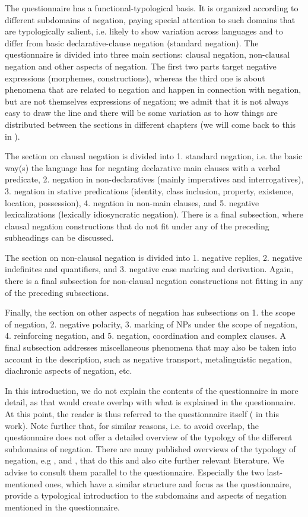 \documentclass[output=paper,colorlinks,citecolor=brown]{langscibook}
\begin{document}
The questionnaire has a functional-typological basis. It is organized according to different subdomains of negation, paying special attention to such domains that are typologically salient, i.e. likely to show variation across languages and to differ from basic declarative-clause negation (standard negation). The questionnaire is divided into three main sections: clausal negation, non-clausal negation and other aspects of negation. The first two parts target negative expressions (morphemes, constructions), whereas the third one is about phenomena that are related to negation and happen in connection with negation, but are not themselves expressions of negation; we admit that it is not always easy to draw the line and there will be some variation as to how things are distributed between the sections in different chapters (we will come back to this in ). 

The section on clausal negation is divided into 1. standard negation, i.e. the basic way(s) the language has for negating declarative main clauses with a verbal predicate, 2. negation in non-declaratives (mainly imperatives and interrogatives), 3. negation in stative predications (identity, class inclusion, property, existence, location, possession), 4. negation in non-main clauses, and 5. negative lexicalizations (lexically idiosyncratic negation). There is a final subsection, where clausal negation constructions that do not fit under any of the preceding subheadings can be discussed. 

The section on non-clausal negation is divided into 1. negative replies, 2. negative indefinites and quantifiers, and 3. negative case marking and derivation. Again, there is a final subsection for non-clausal negation constructions not fitting in any of the preceding subsections. 

Finally, the section on other aspects of negation has subsections on 1. the scope of negation, 2. negative polarity, 3. marking of NPs under the scope of negation, 4. reinforcing negation, and 5. negation, coordination and complex clauses. A final subsection addresses miscellaneous phenomena that may also be taken into account in the description, such as negative transport, metalinguistic negation, diachronic aspects of negation, etc.

In this introduction, we do not explain the contents of the questionnaire in more detail, as that would create overlap with what is explained in the questionnaire. At this point, the reader is thus referred to the questionnaire itself ( in this work). Note further that, for similar reasons, i.e. to avoid overlap, the questionnaire does not offer a detailed overview of the typology of the different subdomains of negation. There are many published overviews of the typology of negation, e.g \citet{Dahl2010}, \citet{AuweraKrasnoukhova2020} and \citet{Miestamo2007,Miestamo2017}, that do this and also cite further relevant literature. We advise to consult them parallel to the questionnaire. Especially the two last-mentioned ones, which have a similar structure and focus as the questionnaire, provide a typological introduction to the subdomains and aspects of negation mentioned in the questionnaire.
\end{document}

